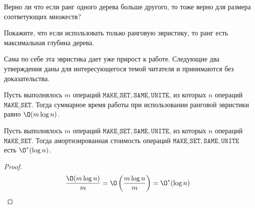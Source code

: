 \Exe Верно ли что если ранг одного дерева больше другого, то тоже верно для размера соответующих множеств?

\Exe Покажите, что если использовать только ранговую эвристику, то ранг есть максимальная глубина дерева.

Сама по себе эта эвристика дает уже прирост к работе. Следующие два утверждения даны для интересующегося темой читателя и принимаются без доказательства.

\ThBd Пусть выполнялось $m$ операций $\texttt{MAKE\_SET}, \texttt{SAME}, \texttt{UNITE}$, из которых $n$ операций $\texttt{MAKE\_SET}$. Тогда суммарное время работы при использовании ранговой эвристики равно $\O(m \log n)$.


    

\ConsBd Пусть выполнялось $m$ операций $\texttt{MAKE\_SET}, \texttt{SAME}, \texttt{UNITE}$, из которых $n$ операций $\texttt{MAKE\_SET}$. Тогда амортизированная стоимость операций $\texttt{MAKE\_SET}, \texttt{SAME}, \texttt{UNITE}$ есть $\O^*(\log n)$.
\begin{proof}

    \begin{equation*}
        \frac{\O(m \log n)}{m} = \O \left(\frac{m \log n}{m}\right) = \O^*(\log n)
    \end{equation*}

\end{proof}


